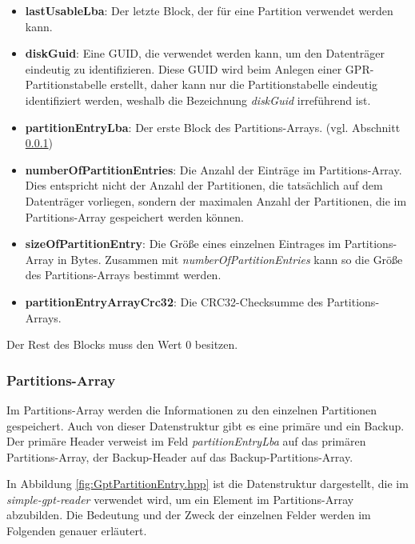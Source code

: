 \begin{itemize}
    \item \textbf{lastUsableLba}:
    Der letzte Block, der für eine Partition verwendet werden kann.

    \item \textbf{diskGuid}:
    Eine GUID, die verwendet werden kann, um den Datenträger eindeutig zu identifizieren.\cite{uefi-spec}
    Diese GUID wird beim Anlegen einer GPR-Partitionstabelle erstellt, daher kann nur die Partitionstabelle eindeutig identifiziert werden, weshalb die Bezeichnung \textit{diskGuid} irreführend ist.

    \item \textbf{partitionEntryLba}:
    Der erste Block des Partitions-Arrays. (vgl. Abschnitt \ref{sec:gpt:structure:entry-array})

    \item \textbf{numberOfPartitionEntries}:
    Die Anzahl der Einträge im Partitions-Array.
    Dies entspricht nicht der Anzahl der Partitionen, die tatsächlich auf dem Datenträger vorliegen, sondern der maximalen Anzahl der Partitionen, die im Partitions-Array gespeichert werden können.

    \item \textbf{sizeOfPartitionEntry}:
    Die Größe eines einzelnen Eintrages im Partitions-Array in Bytes.
    Zusammen mit \textit{numberOfPartitionEntries} kann so die Größe des Partitions-Arrays bestimmt werden.

    \item \textbf{partitionEntryArrayCrc32}:
    Die CRC32-Checksumme des Partitions-Arrays.
    
\end{itemize}

Der Rest des Blocks muss den Wert 0 besitzen.

\subsubsection{Partitions-Array}
\label{sec:gpt:structure:entry-array}
Im Partitions-Array werden die Informationen zu den einzelnen Partitionen gespeichert.
Auch von dieser Datenstruktur gibt es eine primäre und ein Backup.
Der primäre Header verweist im Feld \textit{partitionEntryLba} auf das primären Partitions-Array, der Backup-Header auf das Backup-Partitions-Array.

In Abbildung \ref{fig:GptPartitionEntry.hpp} ist die Datenstruktur dargestellt, die im \textit{simple-gpt-reader} verwendet wird, um ein Element im Partitions-Array abzubilden.
Die Bedeutung und der Zweck der einzelnen Felder werden im Folgenden genauer erläutert.

